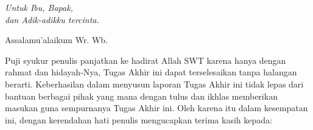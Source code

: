 \documentclass{jtetiskripsi}
\begin{document}
\cover

\approvalpage

\acknowledgment
\begin{flushright}
\emph{Untuk Ibu, Bapak,\\dan Adik-adikku tercinta.}
\end{flushright}

\preface
Assalamu'alaikum Wr. Wb.

\vspace{0.5cm}

Puji syukur penulis panjatkan ke hadirat Allah SWT karena hanya dengan rahmat dan hidayah-Nya, Tugas Akhir ini dapat terselesaikan tanpa halangan berarti. Keberhasilan dalam menyusun laporan Tugas Akhir ini tidak lepas dari bantuan berbagai pihak yang mana dengan tulus dan ikhlas memberikan masukan guna sempurnanya Tugas Akhir ini. Oleh karena itu dalam kesempatan ini, dengan kerendahan hati penulis mengucapkan terima kasih kepada:
\end{document}

